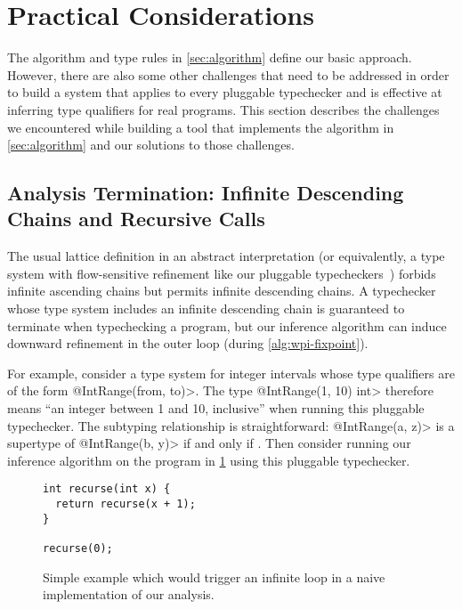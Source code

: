 \section{Practical Considerations}
\label{sec:difficulties}

The algorithm and type rules in \cref{sec:algorithm} define our
basic approach. However, there are also some other challenges
that need to be addressed in order to build a system that applies
to every pluggable typechecker and is effective at inferring
type qualifiers for real programs. This section describes the
challenges we encountered while building a tool that implements
the algorithm in \cref{sec:algorithm} and our solutions to those
challenges.

\subsection{Analysis Termination: Infinite Descending Chains and Recursive Calls}
\label{sec:infinite-descending-chains}

The usual lattice definition in an abstract interpretation
(or equivalently, a type system with flow-sensitive refinement like our
pluggable typecheckers~\cite{Cousot1997}) forbids
infinite ascending chains but permits infinite descending chains.
A typechecker whose type system includes an infinite descending chain
is guaranteed to terminate when typechecking a program, but our
inference algorithm can induce downward refinement in the outer loop
(\ie during \cref{alg:wpi-fixpoint}).

For example, consider a type system for integer intervals
whose type qualifiers are of the form \<@Int\-Range(from, to)>.
The type \<@Int\-Range(1, 10) int> therefore means ``an integer between
1 and 10, inclusive'' when running this pluggable typechecker.
The subtyping relationship is straightforward: \<@Int\-Range(a, z)>
is a supertype of \<@Int\-Range(b, y)> if and only if .
Then consider running our inference algorithm on the program in \cref{fig:descend}
using this pluggable typechecker.

\begin{figure}
\begin{verbatim}
int recurse(int x) {
  return recurse(x + 1);
}

recurse(0);
\end{verbatim}
\caption{Simple example which would trigger an infinite loop in a naive
  implementation of our analysis.}
\label{fig:descend}
\end{figure}

